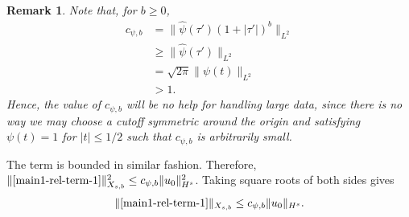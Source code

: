 \documentclass[12pt,reqno]{amsart}
\numberwithin{equation}{section}  %
\renewcommand{\cref}{\Cref}
\newcommand{\wh}{\widehat}
\newtheorem{remark}[theorem]{Remark}
\begin{document}
%
%
%
%
\begin{framed}
%
%
\begin{remark}
Note that, for $b \ge 0$,
%
%
\begin{equation*}
\begin{split}
  c_{\psi, b}
  & = \|\wh{\psi}(\tau') \left( 1 +  | \tau'|
  \right)^{b} \|_{L^{2}}
  \\
  & \ge \| \wh{\psi}(\tau') \|_{L^{2}}
  \\
  & = \sqrt{2 \pi} \|
  \psi(t) \|_{L^{2}}
  \\
  & > 1.
\end{split}
\end{equation*}
%
%
Hence, the value of $c_{\psi, b}$ will be no help for handling large data, since there is
no way we may choose a cutoff symmetric around the origin and satisfying
$\psi(t) =1$ for $| t | \le 1/2$ such that $c_{\psi, b}$ is arbitrarily small. 
\label{rem:value-schwartz-const}
\end{remark}
%
%
\end{framed}
%
%
%
%
The
term \cref{u-0-norm-comp-3} is bounded in similar fashion. Therefore, 
$\|\cref{main1-rel-term-1}\|_{X_{s,b}}^{2} \le c_{\psi,b} 
\|u_{0}\|_{H^s}^2$. Taking square roots of both sides gives
%
%
\begin{equation}
  \begin{split}
    \|\cref{main1-rel-term-1}\|_{X_{s,b}} \le c_{\psi,b} 
    \|u_{0}\|_{H^s}.
  \end{split}
  \label{eqn:u-0-fin-est}
\end{equation}
%
%
%
\end{document}
